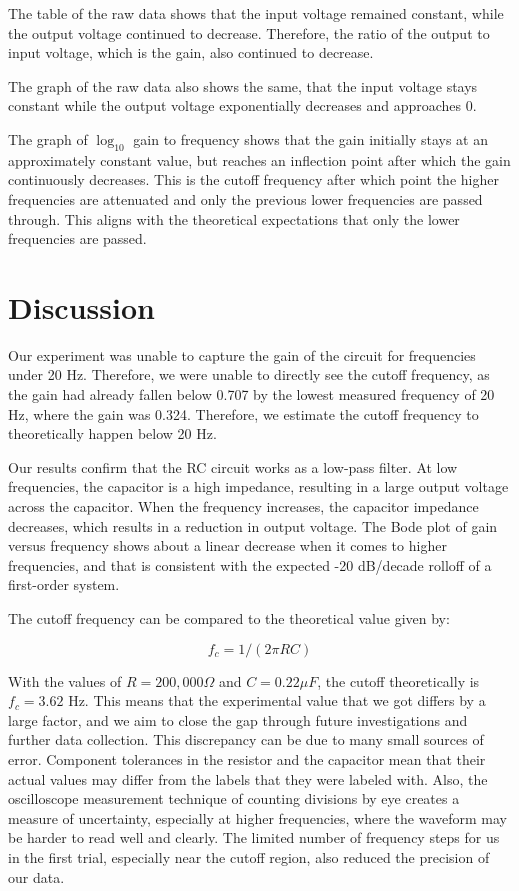 \documentclass[10pt,journal,twoside]{IEEEtran} %
\begin{document}
The table of the raw data shows that the input voltage remained constant, while the output voltage continued to decrease. Therefore, the ratio of the output to input voltage, which is the gain, also continued to decrease. 


The graph of the raw data also shows the same, that the input voltage stays constant while the output voltage exponentially decreases and approaches 0.

The graph of $\log_{10}$ gain to frequency shows that the gain initially stays at an approximately constant value, but reaches an inflection point after which the gain continuously decreases. This is the cutoff frequency after which point the higher frequencies are attenuated and only the previous lower frequencies are passed through. This aligns with the theoretical expectations that only the lower frequencies are passed.

\section{Discussion}

Our experiment was unable to capture the gain of the circuit for frequencies under 20 Hz. Therefore, we were unable to directly see the cutoff frequency, as the gain had already fallen below 0.707 by the lowest measured frequency of 20 Hz, where the gain was 0.324. Therefore, we estimate the cutoff frequency to theoretically happen below 20 Hz.

Our results confirm that the RC circuit works as a low-pass filter. At low frequencies, the capacitor is a high impedance, resulting in a large output voltage across the capacitor. When the frequency increases, the capacitor impedance decreases, which results in a reduction in output voltage. The Bode plot of gain versus frequency shows about a linear decrease when it comes to higher frequencies, and that is consistent with the expected -20 dB/decade rolloff of a first-order system.

The cutoff frequency can be compared to the theoretical value given by: 

\begin{equation}
    f_c = 1/(2\pi RC)
\end{equation}

With the values of $R=200,000\Omega$ and $C=0.22\mu F$, the cutoff theoretically is $f_c=3.62$ Hz. This means that the experimental value that we got differs by a large factor, and we aim to close the gap through future investigations and further data collection. This discrepancy can be due to many small sources of error. Component tolerances in the resistor and the capacitor mean that their actual values may differ from the labels that they were labeled with. Also, the oscilloscope measurement technique of counting divisions by eye creates a measure of uncertainty, especially at higher frequencies, where the waveform may be harder to read well and clearly. The limited number of frequency steps for us in the first trial, especially near the cutoff region, also reduced the precision of our data.
\end{document}
